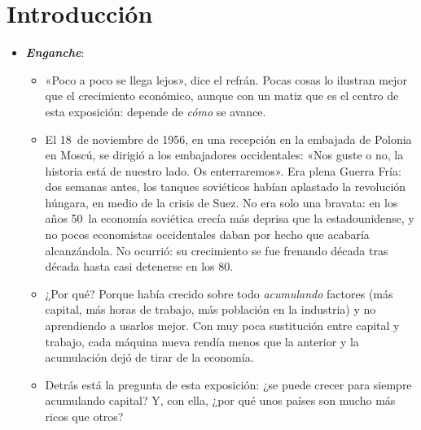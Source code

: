 \documentclass[11pt]{article}
\begin{document}
\tceetitulo

\section*{Introducción}

\begin{itemize}
\item \textbf{\emph{Enganche}}:
  \begin{itemize}
  \item «Poco a poco se llega lejos», dice el refrán. Pocas cosas lo ilustran mejor que el crecimiento económico, aunque con un matiz que es el centro de esta exposición: depende de \emph{cómo} se avance.
  \item El 18~de noviembre de 1956, en una recepción en la embajada de Polonia en Moscú,  se dirigió a los embajadores occidentales: «Nos guste o no, la historia está de nuestro lado. Os enterraremos»\nocite{Time1956Bury}. Era plena Guerra Fría: dos semanas antes, los tanques soviéticos habían aplastado la revolución húngara, en medio de la crisis de Suez. No era solo una bravata: en los años 50~la economía soviética crecía más deprisa que la estadounidense, y no pocos economistas occidentales daban por hecho que acabaría alcanzándola. No ocurrió: su crecimiento se fue frenando década tras década hasta casi detenerse en los 80\nocite{EasterlyFischer1995Soviet}.
  \item ¿Por qué? Porque había crecido sobre todo \emph{acumulando} factores (más capital, más horas de trabajo, más población en la industria) y no aprendiendo a usarlos mejor. Con muy poca sustitución entre capital y trabajo, cada máquina nueva rendía menos que la anterior y la acumulación dejó de tirar de la economía\nocite{Krugman1994Myth,EasterlyFischer1995Soviet}.
  \item Detrás está la pregunta de esta exposición: ¿se puede crecer para siempre acumulando capital? Y, con ella, ¿por qué unos países son mucho más ricos que otros?
  \end{itemize}


\end{itemize}
\end{document}

